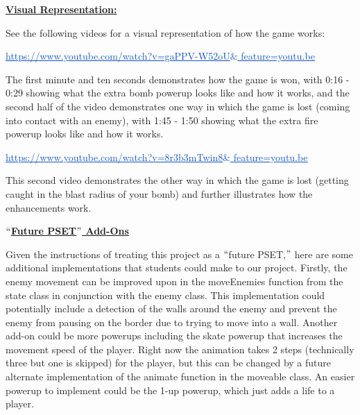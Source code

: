 \documentclass[12pt]{article}
\begin{document}
\vspace{\baselineskip}
\textbf{\uline{Visual Representation:}}\par

See the following videos for a visual representation of how the game works: \par

\href{https://www.youtube.com/watch?v=gaPPV-W52oU&feature=youtu.be}{\textcolor[HTML]{1155CC}{\uline{https://www.youtube.com/watch?v=gaPPV-W52oU$\&$ feature=youtu.be}}} \par

The first minute and ten seconds demonstrates how the game is won, with 0:16 - 0:29 showing what the extra bomb powerup looks like and how it works, and the second half of the video demonstrates one way in which the game is lost (coming into contact with an enemy), with 1:45 - 1:50 showing what the extra fire powerup looks like and how it works.\par

\href{https://www.youtube.com/watch?v=8r3b3mTwin8&feature=youtu.be}{\textcolor[HTML]{1155CC}{\uline{https://www.youtube.com/watch?v=8r3b3mTwin8$\&$ feature=youtu.be}}}\par

This second video demonstrates the other way in which the game is lost (getting caught in the blast radius of your bomb) and further illustrates how the enhancements work.\par


\vspace{\baselineskip}
\textbf{\uline{$``$Future PSET$"$  Add-Ons}}\par

Given the instructions of treating this project as a $``$future PSET,$"$  here are some additional implementations that students could make to our project. Firstly, the enemy movement can be improved upon in the moveEnemies function from the state class in conjunction with the enemy class. This implementation could potentially include a detection of the walls around the enemy and prevent the enemy from pausing on the border due to trying to move into a wall. Another add-on could be more powerups including the skate powerup that increases the movement speed of the player. Right now the animation takes 2 steps (technically three but one is skipped) for the player, but this can be changed by a future alternate implementation of the animate function in the moveable class. An easier powerup to implement could be the 1-up powerup, which just adds a life to a player.\par
\end{document}
